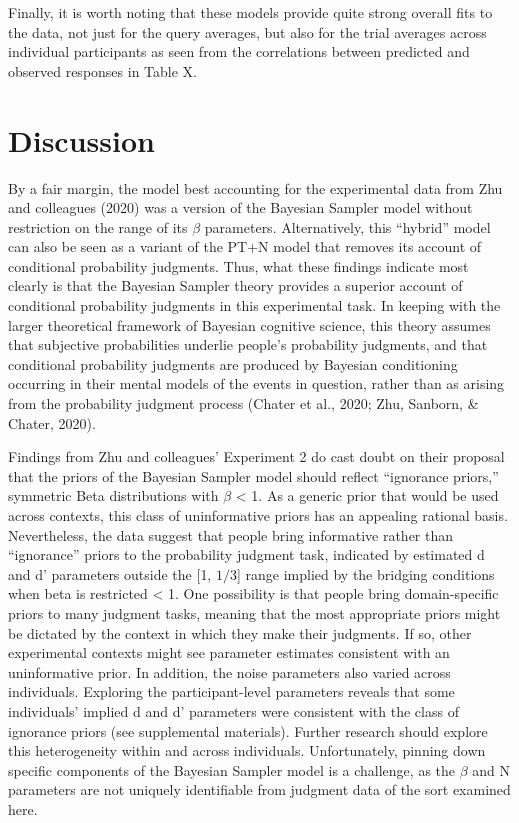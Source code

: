 \documentclass[
  english,
  man,floatsintext]{apa6}
\begin{document}
Finally, it is worth noting that these models provide quite strong overall fits to the data, not just for the query averages, but also for the trial averages across individual participants as seen from the correlations between predicted and observed responses in Table X.

\hypertarget{discussion}{%
\section{Discussion}\label{discussion}}

By a fair margin, the model best accounting for the experimental data from Zhu and colleagues (2020) was a version of the Bayesian Sampler model without restriction on the range of its \(\beta\) parameters. Alternatively, this ``hybrid'' model can also be seen as a variant of the PT+N model that removes its account of conditional probability judgments. Thus, what these findings indicate most clearly is that the Bayesian Sampler theory provides a superior account of conditional probability judgments in this experimental task. In keeping with the larger theoretical framework of Bayesian cognitive science, this theory assumes that subjective probabilities underlie people's probability judgments, and that conditional probability judgments are produced by Bayesian conditioning occurring in their mental models of the events in question, rather than as arising from the probability judgment process (Chater et al., 2020; Zhu, Sanborn, \& Chater, 2020).

Findings from Zhu and colleagues' Experiment 2 do cast doubt on their proposal that the priors of the Bayesian Sampler model should reflect ``ignorance priors,'' symmetric Beta distributions with \(\beta\) \textless{} 1. As a generic prior that would be used across contexts, this class of uninformative priors has an appealing rational basis. Nevertheless, the data suggest that people bring informative rather than ``ignorance'' priors to the probability judgment task, indicated by estimated d and d' parameters outside the {[}1, \(1/3\){]} range implied by the bridging conditions when beta is restricted \textless{} 1. One possibility is that people bring domain-specific priors to many judgment tasks, meaning that the most appropriate priors might be dictated by the context in which they make their judgments. If so, other experimental contexts might see parameter estimates consistent with an uninformative prior. In addition, the noise parameters also varied across individuals. Exploring the participant-level parameters reveals that some individuals' implied d and d' parameters were consistent with the class of ignorance priors (see supplemental materials). Further research should explore this heterogeneity within and across individuals. Unfortunately, pinning down specific components of the Bayesian Sampler model is a challenge, as the \(\beta\) and N parameters are not uniquely identifiable from judgment data of the sort examined here.
\end{document}

